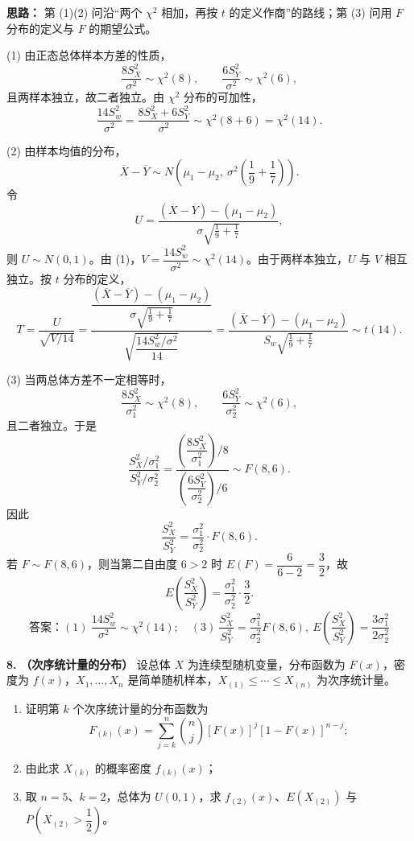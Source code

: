 \ifshowsolutions%
\textbf{思路：} 第 (1)(2) 问沿“两个 $\chi^2$ 相加，再按 $t$ 的定义作商”的路线；第 (3) 问用 $F$ 分布的定义与 $F$ 的期望公式。

(1) 由正态总体样本方差的性质，
\[
\frac{8S_X^2}{\sigma^2}\sim\chi^2(8),\qquad
\frac{6S_Y^2}{\sigma^2}\sim\chi^2(6),
\]
且两样本独立，故二者独立。由 $\chi^2$ 分布的可加性，
\[
\frac{14S_w^2}{\sigma^2}
=\frac{8S_X^2+6S_Y^2}{\sigma^2}
\sim\chi^2(8+6)=\chi^2(14).
\]

(2) 由样本均值的分布，
\[
\overline{X}-\overline{Y}\sim N\!\left(\mu_1-\mu_2,\ \sigma^2\left(\frac19+\frac17\right)\right).
\]
令
\[
U=\frac{(\overline{X}-\overline{Y})-(\mu_1-\mu_2)}
{\sigma\sqrt{\frac19+\frac17}},
\]
则 $U\sim N(0,1)$。由 (1)，$V=\dfrac{14S_w^2}{\sigma^2}\sim\chi^2(14)$。由于两样本独立，$U$ 与 $V$ 相互独立。按 $t$ 分布的定义，
\[
T=\frac{U}{\sqrt{V/14}}
=\frac{\dfrac{(\overline{X}-\overline{Y})-(\mu_1-\mu_2)}
{\sigma\sqrt{\frac19+\frac17}}}
{\sqrt{\dfrac{14S_w^2/\sigma^2}{14}}}
=\frac{(\overline{X}-\overline{Y})-(\mu_1-\mu_2)}
{S_w\sqrt{\frac19+\frac17}}
\sim t(14).
\]

(3) 当两总体方差不一定相等时，
\[
\frac{8S_X^2}{\sigma_1^2}\sim\chi^2(8),\qquad
\frac{6S_Y^2}{\sigma_2^2}\sim\chi^2(6),
\]
且二者独立。于是
\[
\frac{S_X^2/\sigma_1^2}{S_Y^2/\sigma_2^2}
=\frac{\left(\dfrac{8S_X^2}{\sigma_1^2}\right)\Big/8}
{\left(\dfrac{6S_Y^2}{\sigma_2^2}\right)\Big/6}
\sim F(8,6).
\]
因此
\[
\frac{S_X^2}{S_Y^2}=\frac{\sigma_1^2}{\sigma_2^2}\cdot F(8,6).
\]
若 $F\sim F(8,6)$，则当第二自由度 $6>2$ 时 $E(F)=\dfrac{6}{6-2}=\dfrac32$，故
\[
E\!\left(\frac{S_X^2}{S_Y^2}\right)
=\frac{\sigma_1^2}{\sigma_2^2}\cdot\frac32.
\]
\[
\boxed{\text{答案：}(1)\ \frac{14S_w^2}{\sigma^2}\sim\chi^2(14);\quad
(3)\ \frac{S_X^2}{S_Y^2}=\frac{\sigma_1^2}{\sigma_2^2}F(8,6),\
E\!\left(\frac{S_X^2}{S_Y^2}\right)=\frac{3\sigma_1^2}{2\sigma_2^2}}
\]
\else \answerarea[8] \fi%

\textbf{8.} \textbf{（次序统计量的分布）} 设总体 $X$ 为连续型随机变量，分布函数为 $F(x)$，密度为 $f(x)$，$X_1,\ldots,X_n$ 是简单随机样本，$X_{(1)}\leq\cdots\leq X_{(n)}$ 为次序统计量。
\begin{enumerate}[label=(\arabic*)]
    \item 证明第 $k$ 个次序统计量的分布函数为
    \[
    F_{(k)}(x)=\sum_{j=k}^{n}\binom{n}{j}[F(x)]^j[1-F(x)]^{n-j};
    \]
    \item 由此求 $X_{(k)}$ 的概率密度 $f_{(k)}(x)$；
    \item 取 $n=5$、$k=2$，总体为 $U(0,1)$，求 $f_{(2)}(x)$、$E(X_{(2)})$ 与 $P\!\left(X_{(2)}>\dfrac12\right)$。
\end{enumerate}

